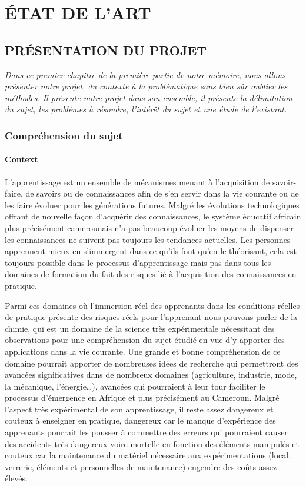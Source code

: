 \part{ÉTAT DE L’ART}
\chapter{PRÉSENTATION DU PROJET}

\textit{Dans ce premier chapitre de la première partie de notre mémoire, nous allons présenter
	notre projet, du contexte à la problématique sans bien sûr oublier les méthodes. Il présente
	notre projet dans son ensemble, il présente la délimitation du sujet, les problèmes à résoudre,
	l’intérêt du sujet et une étude de l’existant.}

\clearpage

\section{Compréhension du sujet}

\subsection{Context}

L’apprentissage est un ensemble de mécanismes menant à l'acquisition de savoir-faire, de savoirs ou de connaissances afin de s’en servir dans la vie courante ou de les faire évoluer pour les générations futures.
Malgré les évolutions technologiques offrant de nouvelle façon d’acquérir des connaissances, le système éducatif africain plus précisément camerounais n’a pas beaucoup évoluer les moyens de dispenser les connaissances ne suivent pas toujours les tendances actuelles. 
Les personnes apprennent mieux en s’immergent dans ce qu’ils font qu’en le théorisant, cela est toujours possible dans le processus d’apprentissage mais pas dans tous les domaines de formation du fait des risques lié à l’acquisition des connaissances en pratique.

Parmi ces domaines où l’immersion réel des apprenants dans les conditions réelles de pratique présente des risques réels pour l’apprenant nous pouvons parler de la chimie, qui est un domaine de la science très expérimentale nécessitant des observations pour une compréhension du sujet étudié en vue d’y apporter des applications dans la vie courante. Une grande et bonne compréhension de ce domaine pourrait apporter de nombreuses idées de recherche qui permettront des avancées significatives dans de nombreux domaines (agriculture, industrie, mode, la mécanique, l'énergie…), avancées qui pourraient à leur tour faciliter le processus d'émergence en Afrique et plus précisément au Cameroun. Malgré l'aspect très expérimental de son apprentissage, il reste assez dangereux et couteux à enseigner en pratique, dangereux car le manque d’expérience des apprenants pourrait les pousser à commettre des erreurs qui pourraient causer des accidents très dangereux voire mortelle en fonction des éléments manipulés et couteux car la maintenance du matériel nécessaire aux expérimentations (local, verrerie, éléments et personnelles de maintenance) engendre des coûts assez élevés.

